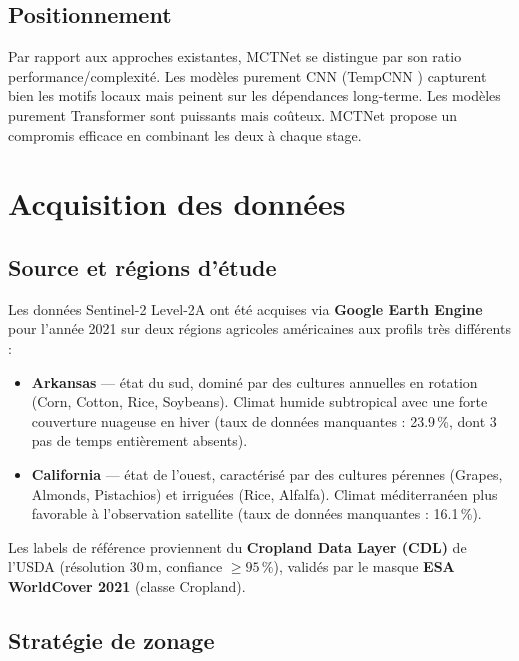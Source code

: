\subsection{Positionnement}

Par rapport aux approches existantes, MCTNet se distingue par son ratio
performance/complexité. Les modèles purement CNN (TempCNN \cite{pelletier2019})
capturent bien les motifs locaux mais peinent sur les dépendances long-terme.
Les modèles purement Transformer sont puissants mais coûteux. MCTNet propose
un compromis efficace en combinant les deux à chaque stage.

\section{Acquisition des données}
\label{sec:acquisition}

\subsection{Source et régions d'étude}

Les données Sentinel-2 Level-2A ont été acquises via \textbf{Google Earth
Engine} pour l'année 2021 sur deux régions agricoles américaines aux
profils très différents :

\begin{itemize}
  \item \textbf{Arkansas} — état du sud, dominé par des cultures annuelles
        en rotation (Corn, Cotton, Rice, Soybeans). Climat humide subtropical
        avec une forte couverture nuageuse en hiver (taux de données
        manquantes : 23.9\,\%, dont 3 pas de temps entièrement absents).
  \item \textbf{California} — état de l'ouest, caractérisé par des cultures
        pérennes (Grapes, Almonds, Pistachios) et irriguées (Rice, Alfalfa).
        Climat méditerranéen plus favorable à l'observation satellite (taux
        de données manquantes : 16.1\,\%).
\end{itemize}

Les labels de référence proviennent du \textbf{Cropland Data Layer (CDL)}
de l'USDA (résolution 30\,m, confiance $\geq 95\,\%$), validés par le masque
\textbf{ESA WorldCover 2021} (classe Cropland).

\subsection{Stratégie de zonage}

